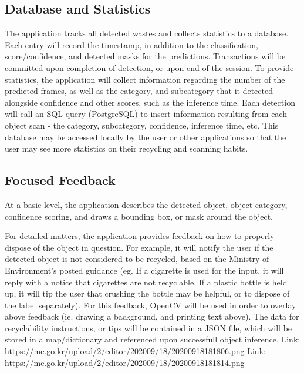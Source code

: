 \documentclass[conference]{IEEEtran}
\begin{document}
\subsection{Database and Statistics}
The application tracks all detected wastes and collects statistics to a database. Each entry will record the timestamp, in addition to the classification, score/confidence, and detected masks for the predictions. Transactions will be committed upon completion of detection, or upon end of the session.
\newline
To provide statistics, the application will collect information regarding the number of the predicted frames, as well as the category, and subcategory that it detected - alongside confidence and other scores, such as the inference time.
\newline
Each detection will call an SQL query (PostgreSQL) to insert information resulting from each object scan - the category, subcategory, confidence, inference time, etc. This database may be accessed locally by the user or other applications so that the user may see more statistics on their recycling and scanning habits.

\subsection{Focused Feedback}
At a basic level, the application describes the detected object, object category, confidence scoring, and draws a bounding box, or mask around the object.

For detailed matters, the application provides feedback on how to properly dispose of the object in question. For example, it will notify the user if the detected object is not considered to be recycled, based on the Ministry of Environment's posted guidance (eg. If a cigarette is used for the input, it will reply with a notice that cigarettes are not recyclable. If a plastic bottle is held up, it will tip the user that crushing the bottle may be helpful, or to dispose of the label separately).
\newline
For this feedback, OpenCV will be used in order to overlay above feedback (ie. drawing a background, and printing text above). The data for recyclability instructions, or tips will be contained in a JSON file, which will be stored in a map/dictionary and referenced upon successfull object inference.
\newline
\newline
Link: https://me.go.kr/upload/2/editor/202009/18/20200918181806.png
\newline
Link: https://me.go.kr/upload/2/editor/202009/18/20200918181814.png
\end{document}
